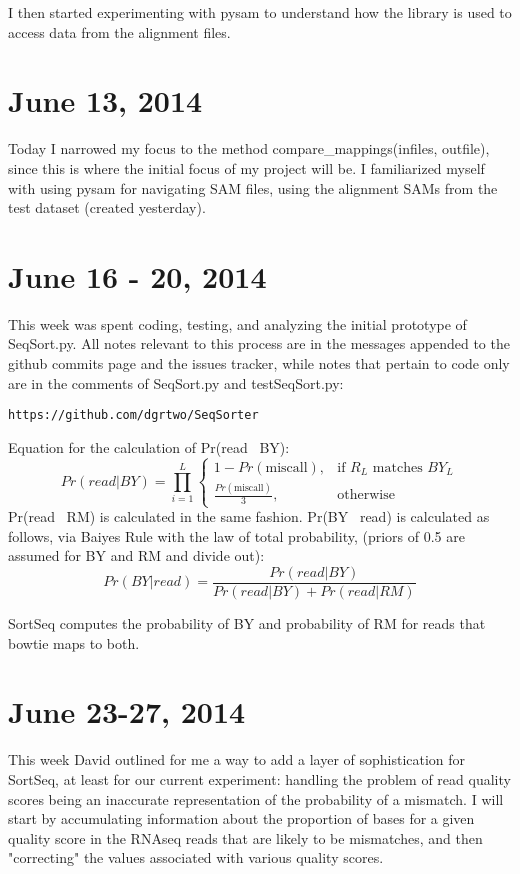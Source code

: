 \documentclass[11pt]{article}
\begin{document}
I then started experimenting with pysam to understand how the library is used to access data from the alignment files.
\section*{June 13, 2014}
Today I narrowed my focus to the method compare\_mappings(infiles, outfile), since this is where the initial focus of my project will be. I familiarized myself with using pysam for navigating SAM files, using the alignment SAMs from the test dataset (created yesterday).

\section*{June 16 - 20, 2014}
This week was spent coding, testing, and analyzing the initial prototype of SeqSort.py. All notes relevant to this process are in the messages appended to the github commits page and the issues tracker, while notes that pertain to code only are in the comments of SeqSort.py and testSeqSort.py:

\begin{verbatim}
https://github.com/dgrtwo/SeqSorter
\end{verbatim}
\noindent
Equation for the calculation of Pr(read \textbar\ BY):
\begin{equation*}
Pr(read | BY) = \prod_{i=1}^{L}\begin{cases}
    1 - Pr(\text{miscall}), & \text{if }R_{L}\text{ matches } BY_{L}\\
    \frac{Pr(\text{miscall})}{3}, & \text{otherwise}
  \end{cases}
\end{equation*}
\smallskip
Pr(read \textbar\ RM) is calculated in the same fashion. Pr(BY \textbar\ read) is calculated as follows, via Baiyes Rule with the law of total probability, (priors of 0.5 are assumed for BY and RM and divide out):
\begin{equation*}
  Pr(BY | read) = \frac{Pr(read | BY)}{Pr(read | BY) + Pr(read | RM)}
\end{equation*}

SortSeq computes the probability of BY and probability of RM for reads that bowtie maps to both. 

\section*{June 23-27, 2014}
This week David outlined for me a way to add a layer of sophistication for SortSeq, at least for our current experiment: handling the problem of read quality scores being an inaccurate representation of the probability of a mismatch. I will start by accumulating information about the proportion of bases for a given quality score in the RNAseq reads that are likely to be mismatches, and then "correcting" the values associated with various quality scores.\\
\end{document}
